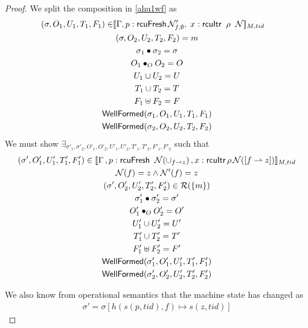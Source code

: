 \begin{proof}
We split the composition in  \ref{ahu1wf} as 
\begin{gather} \label{ahu11wf}
  \begin{aligned}
    (\sigma, O_{1}, U_{1}, T_{1},F_1 ) \in & \llbracket  \Gamma, p:\textsf{rcuFresh}\,\mathcal{N}'_{f,\emptyset},\; x:\textsf{rcuItr}\;\; \rho \;\; \mathcal{N} \rrbracket_{M,tid} \end{aligned}\\
\label{ahu12wf}
(\sigma, O_{2}, U_{2}, T_{2}, F_2) = m
\\
\label{ahusigwf}
\sigma_1 \bullet \sigma_2 = \sigma
\\
\label{ahu13wf}
O_{1} \bullet_{O} O_{2} = O
\\
\label{ahu14wf}
U_{1} \cup U_{2} = U
\\
\label{ahu15wf}
T_{1} \cup T_{2} = T
\\
\label{ahuwff}
F_1 \uplus F_2 = F
\\
\label{ahu16wf}
\textsf{WellFormed}(\sigma_1,O_{1},U_{1},T_{1},F_1)
\\
\label{ahu17wf}
\textsf{WellFormed}(\sigma_2,O_{2},U_{2},T_{2}, F_2)
\end{gather}
We must show $\exists_{\sigma'_1, \sigma'_2, O'_{1}, O'_{2}, U'_{1}, U'_{2}, T'_{1}, T'_{2},F'_1 , F'_2}$ such that
\begin{gather}\label{phu5wf}
\begin{aligned}
(\sigma',O'_{1},U'_{1}, T'_{1},F'_1)  \in \llbracket \Gamma \,, p : \textsf{rcuFresh} \;\; \mathcal{N}(\cup_{ f \rightharpoonup z}) \, , x:\textsf{rcuItr}\, \rho \, \mathcal{N}([f\rightharpoonup z]) \rrbracket_{M,tid}
\end{aligned}
\\
\label{phuNwf}
\mathcal{N}(f) = z \land \mathcal{N}'(f) = z
\\
\label{phu6wf}
(\sigma',O'_{2},U'_{2}, T'_{2},F'_2) \in \mathcal{R}(\{m\})
\\
\label{ahusigwf'}
\sigma'_1 \bullet \sigma'_2 = \sigma'
\\
\label{phu7wf}
O'_{1} \bullet_{O} O'_{2} = O'
\\
\label{phu8wf}
U'_{1} \cup U'_{2} = U'
\\
\label{phu9wf}
T'_{1} \cup T'_{2} = T'
\\
\label{phuwff}
F'_1 \uplus F'_2 = F'
\\
\label{phu10wf}
\textsf{WellFormed}(\sigma_1',O'_{1},U'_{1},T'_{1}, F'_1) \\
\label{phu11wf}
\textsf{WellFormed}(\sigma_2',O'_{2},U'_{2},T'_{2}, F'_2)
\end{gather}

We also know from operational semantics that the machine state has changed as
\begin{gather}\label{ahuswf}
\sigma' =  \sigma[h(s(p,tid),f) \mapsto s(z,tid)]
\end{gather}


\end{proof}
